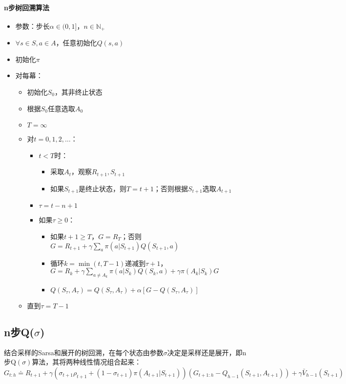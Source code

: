 \documentclass[
12pt, %
a4paper, 
oneside, %
headinclude,footinclude, %
]{scrartcl}
\begin{document}
\paragraph{n步树回溯算法}
\begin{itemize}
\item 参数：步长$ \alpha \in (0,1] $，$ n \in \mathbb{N}_+ $
\item $ \forall s \in S, a \in A $，任意初始化$ Q(s, a) $
\item 初始化$ \pi $
\item 对每幕：
\begin{itemize}
\item 初始化$ S_0 $，其非终止状态
\item 根据$ S_0 $任意选取$ A_0 $
\item $ T = \infty $
\item 对$ t = 0, 1, 2, \dots $：
\begin{itemize}
\item $ t < T $时：
\begin{itemize}
\item 采取$ A_t $，观察$ R_{t + 1}, S_{t + 1} $
\item 如果$ S_{t + 1} $是终止状态，则$ T = t + 1 $；否则根据$ S_{t + 1} $选取$ A_{t + 1} $
\end{itemize}
\item $ \tau = t - n + 1 $
\item 如果$ \tau \geq 0 $：
\begin{itemize}
\item 如果$ t + 1 \geq T $，$ G = R_T $；否则$ G = R_{t + 1} + \gamma \sum_a \pi(a|S_{t + 1})Q(S_{t + 1},a) $
\item 循环$ k = \min(t, T - 1) $递减到$ \tau + 1 $，$ G = R_k + \gamma \sum_{a \neq A_k} \pi(a|S_k)Q(S_k,a) + \gamma \pi(A_k|S_k)G $
\item $ Q(S_{\tau},A_{\tau}) = Q(S_{\tau},A_{\tau}) + \alpha[G - Q(S_{\tau},A_{\tau})] $
\end{itemize}
\end{itemize}
\item 直到$ \tau = T - 1 $
\end{itemize}
\end{itemize}
\subsection{n步Q($ \sigma $)}
结合采样的Sarsa和展开的树回溯，在每个状态由参数$ \sigma $决定是采样还是展开，即n步Q$ (\sigma) $算法，其将两种线性情况组合起来：
$$ G_{t:h} \doteq R_{t + 1} + \gamma (\sigma_{t + 1} \rho_{t + 1} + (1 - \sigma_{t + 1}) \pi(A_{t + 1}|S_{t + 1}))(G_{t + 1:h} - Q_{h - 1}(S_{t + 1}, A_{t + 1})) + \gamma \bar{V}_{h - 1}(S_{t + 1}) $$
\end{document}
